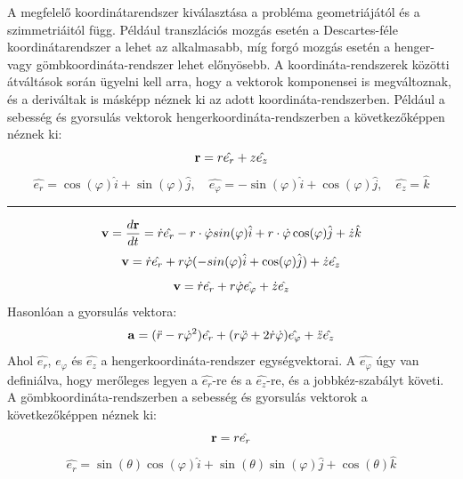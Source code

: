 \documentclass[a4paper,12pt]{article}
\begin{document}
A megfelelő koordinátarendszer kiválasztása a probléma geometriájától és a szimmetriáitól függ. Például transzlációs mozgás esetén a Descartes-féle koordinátarendszer a lehet az alkalmasabb,
míg forgó mozgás esetén a henger- vagy gömbkoordináta-rendszer lehet előnyösebb. A koordináta-rendszerek közötti átváltások során ügyelni kell arra, hogy a vektorok komponensei is megváltoznak,
és a deriváltak is másképp néznek ki az adott koordináta-rendszerben. Például a sebesség és gyorsulás vektorok hengerkoordináta-rendszerben a következőképpen néznek ki: 
\begin{equation}
    \bold{r} = r\hat{e_r} + z\hat{e_z}
\end{equation}
\begin{equation}
     \hat{e_r} = \cos(\varphi)\hat{i} + \sin(\varphi)\hat{j}, \quad \hat{e_\varphi} = -\sin(\varphi)\hat{i} + \cos(\varphi)\hat{j}, \quad \hat{e_z} = \hat{k}
\end{equation}
\noindent\hfil\rule{0.5\textwidth}{.4pt}\hfil
\begin{equation}
    \bold{v} = \frac{d\bold{r}}{dt} = \dot{r}\hat{e_r} - r \cdot \dot{\varphi}sin(\varphi)\hat{i} + r \cdot \dot{\varphi}\cos(\varphi)\hat{j} + \dot{z}\hat{k} 
\end{equation}
\begin{equation}
    \bold{v} = \dot{r}\hat{e_r} + r\dot{\varphi}(- sin(\varphi)\hat{i} + \cos(\varphi)\hat{j}) + \dot{z}\hat{e_z}
\end{equation}
\begin{equation}
    \bold{v} = \dot{r}\hat{e_r} + r\dot{\varphi}\hat{e_\varphi} + \dot{z}\hat{e_z}
\end{equation}
Hasonlóan a gyorsulás vektora: 
\begin{equation}
    \bold{a} = (\ddot{r} - r\dot{\varphi}^2)\hat{e_r} + (r\ddot{\varphi} + 2\dot{r}\dot{\varphi})\hat{e_\varphi} + \ddot{z}\hat{e_z}
\end{equation}
Ahol $\hat{e_r}$, $\hat{e_\varphi}$ és $\hat{e_z}$ a hengerkoordináta-rendszer egységvektorai. A $\hat{e_\varphi}$ úgy van definiálva, hogy merőleges legyen a $\hat{e_r}$-re és a $\hat{e_z}$-re, és a jobbkéz-szabályt követi. 
A gömbkoordináta-rendszerben a sebesség és gyorsulás vektorok a következőképpen néznek ki:
\begin{equation}
    \bold{r} = r\hat{e_r}
\end{equation}
\begin{equation}
     \hat{e_r} = \sin(\theta)\cos(\varphi)\hat{i} + \sin(\theta)\sin(\varphi)\hat{j} + \cos(\theta)\hat{k}
\end{equation}
\end{document}
